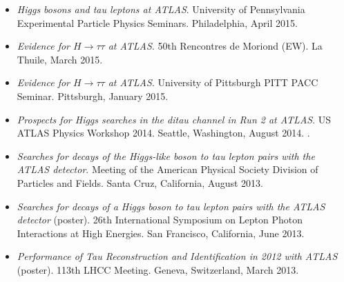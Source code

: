 \documentclass{resume2}
\begin{document}
\begin{resume}
\vspace{0.6cm}
\begin{itemize}[leftmargin=*]
  \item \textit{Higgs bosons and tau leptons at ATLAS}. University of Pennsylvania Experimental Particle Physics Seminars. Philadelphia, April 2015.
  \item \textit{Evidence for $H\rightarrow\tau\tau$ at ATLAS}. 50th Rencontres de Moriond (EW). La Thuile, March 2015.
  \item \textit{Evidence for $H\rightarrow\tau\tau$ at ATLAS}. University of Pittsburgh PITT PACC Seminar. Pittsburgh, January 2015.
  \item \textit{Prospects for Higgs searches in the ditau channel in Run 2 at ATLAS}. US ATLAS Physics Workshop 2014. Seattle, Washington, August 2014. {\color{red}{ATLAS Internal}}.
  \item \textit{Searches for decays of the Higgs-like boson to tau lepton pairs with the ATLAS detector}. Meeting of the American Physical Society Division of Particles and Fields. Santa Cruz, California, August 2013.
  \item \textit{Searches for decays of a Higgs boson to tau lepton pairs with the ATLAS detector} (poster). 26th International Symposium on Lepton Photon Interactions at High Energies. San Francisco, California, June 2013.
  \item \textit{Performance of Tau Reconstruction and Identification in 2012 with ATLAS} (poster). 113th LHCC Meeting. Geneva, Switzerland, March 2013.
\end{itemize}

\pagebreak


\end{resume}
\end{document}
